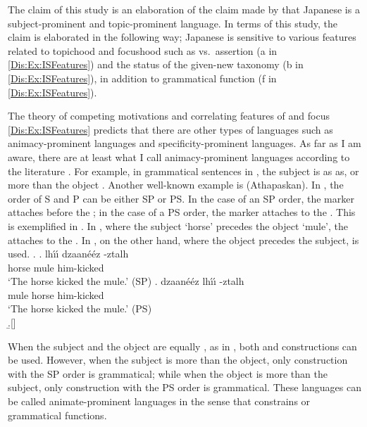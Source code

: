 The claim of this study is an elaboration of the claim made by
 that
Japanese is a subject-prominent and topic-prominent language.
In terms of this study,
the claim is elaborated in the following way;
Japanese is sensitive to various features related to topichood and focushood such as  vs.~assertion (a in \ref{Dis:Ex:ISFeatures})
and the status of the given-new taxonomy (b in \ref{Dis:Ex:ISFeatures}),
in addition to grammatical function (f in \ref{Dis:Ex:ISFeatures}).

The theory of competing motivations and correlating features of  and focus \ref{Dis:Ex:ISFeatures} predicts that
there are other types of languages such as animacy-prominent languages and specificity-prominent languages.
As far as I am aware,
there are at least what I call animacy-prominent languages according to the literature \cite[]{dahlfraurud96,minkoff00,deswartetal07}.
For example, in grammatical sentences in ,
the subject is as  as, or more  than the object \cite{minkoff00}.
Another well-known example is  (Athapaskan).
In , the order of S and P can be either SP or PS.
In the case of an SP order, the marker  attaches before the ;
in the case of a PS order, the marker  attaches to the  \cite{hale72,frischberg72}.
This is exemplified in \Next.
In \Next[a],
where the subject `horse' precedes the object `mule',
the   attaches to the .
In \Next[b], on the other hand,
where the object precedes the subject,
 is used.
%
\ex.
 \ag. lh\'{\i}\'{\i} dzaan\'e\'ez -ztalh \\
      horse mule him-kicked \\
      `The horse kicked the mule.' \hfill{(SP)}
 \bg. dzaan\'e\'ez lh\'{\i}\'{\i} -ztalh \\
      mule horse him-kicked \\
      `The horse kicked the mule.' \hfill{(PS)}\\
 \b.[] \hfill{\cite[300]{hale72}}

When the subject and the object are equally , as in \Last,
both  and  constructions can be used.
However,
when the subject is more  than the object,
only construction with the SP order is grammatical;
while when the object is more  than the subject,
only  construction with the PS order is grammatical.
These languages can be called animate-prominent languages
in the sense that
 constrains  or grammatical functions.



